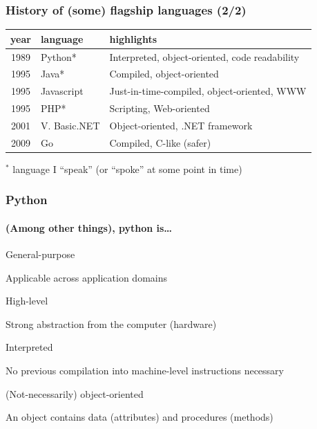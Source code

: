 \documentclass[xcolor=x11names,handout]{beamer}
\begin{document}
\begin{frame}
\frametitle{History of (some) flagship languages (2/2)}

\begin{center}
\begin{tabular}{clp{79mm}}
\hline
\bf year	& \bf language	& \bf highlights	\\
\hline
1989	& \alert{Python}*	& Interpreted, object-oriented, code readability \\
1995	& Java*			& Compiled, object-oriented	\\
1995	& Javascript	&Just-in-time-compiled, object-oriented, WWW	\\
1995	& PHP*			& Scripting, Web-oriented	\\
2001	& V\@. Basic.NET	& Object-oriented, .NET framework	\\
2009	& Go			& Compiled, C-like (safer)	\\
\hline
\end{tabular}
\end{center}

\bigskip
$^*$ language I ``speak'' (or ``spoke'' at some point in time)
\end{frame}

\begin{frame}
\frametitle{Python}
\framesubtitle{(Among other things), python is\ldots}

\alert{General-purpose}

Applicable across application domains
\bigskip 	\pause

\alert{High-level}

Strong abstraction from the computer (hardware)
\bigskip 	\pause

\alert{Interpreted}

No previous compilation into machine-level instructions necessary
\bigskip 	\pause

\alert{(Not-necessarily) object-oriented}

An object contains data (attributes) and procedures (methods)
\end{frame}
\end{document}
